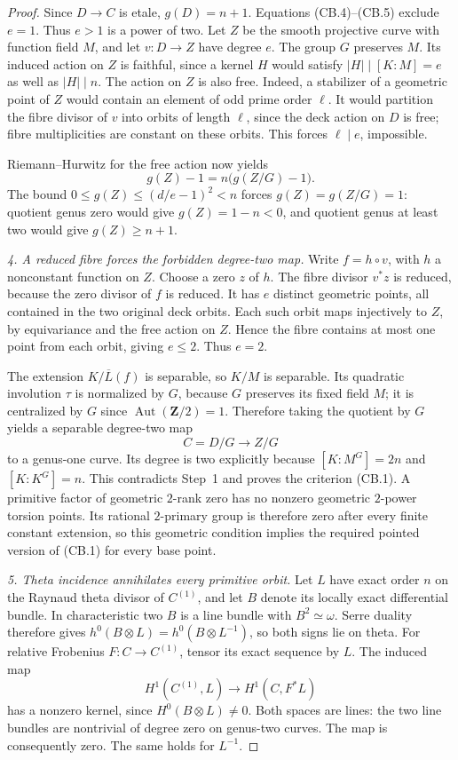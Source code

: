 \begin{proof}
Since $D\to C$ is etale, $g(D)=n+1$. Equations (CB.4)--(CB.5)
exclude $e=1$. Thus $e>1$ is a power of two. Let $Z$ be the smooth
projective curve with function field $M$, and let $v:D\to Z$ have
degree $e$. The group $G$ preserves $M$. Its induced action on $Z$
is faithful, since a kernel $H$ would satisfy
$|H|\mid[K:M]=e$ as well as $|H|\mid n$.
The action on $Z$ is also free. Indeed, a stabilizer of a geometric
point of $Z$ would contain an element of odd prime order $\ell$.
It would partition the fibre divisor of $v$ into orbits of length
$\ell$, since the deck action on $D$ is free; fibre multiplicities
are constant on these orbits. This forces $\ell\mid e$, impossible.

Riemann--Hurwitz for the free action now yields
\[
                    g(Z)-1=n\bigl(g(Z/G)-1\bigr).
\]
The bound $0\le g(Z)\le(d/e-1)^2<n$ forces
$g(Z)=g(Z/G)=1$: quotient genus zero would give $g(Z)=1-n<0$,
and quotient genus at least two would give $g(Z)\ge n+1$.

\emph{4. A reduced fibre forces the forbidden degree-two map.}
Write $f=h\circ v$, with $h$ a nonconstant function on $Z$.
Choose a zero $z$ of $h$. The fibre divisor $v^*z$ is reduced,
because the zero divisor of $f$ is reduced. It has $e$ distinct
geometric points, all contained in the two original deck orbits.
Each such orbit maps injectively to $Z$, by equivariance and the
free action on $Z$. Hence the fibre contains at most one point from
each orbit, giving $e\le2$. Thus $e=2$.

The extension $K/\overline L(f)$ is separable, so $K/M$ is separable.
Its quadratic involution $\tau$ is normalized by $G$, because $G$
preserves its fixed field $M$; it is centralized by $G$ since
$\operatorname{Aut}(\mathbf Z/2)=1$. Therefore taking the quotient
by $G$ yields a separable degree-two map
\[
                  C=D/G\longrightarrow Z/G
\]
to a genus-one curve. Its degree is two explicitly because
$[K:M^G]=2n$ and $[K:K^G]=n$.
This contradicts Step~1 and proves the
criterion (CB.1). A primitive factor of geometric $2$-rank zero
has no nonzero geometric $2$-power torsion points. Its rational
$2$-primary group is therefore zero after every finite constant
extension, so this geometric condition implies the required
pointed version of (CB.1) for every base point.

\emph{5. Theta incidence annihilates every primitive orbit.}
Let $L$ have exact order $n$ on the Raynaud theta divisor of
$C^{(1)}$, and let $B$ denote its locally exact differential bundle.
In characteristic two $B$ is a line bundle with $B^2\simeq\omega$.
Serre duality therefore gives
$h^0(B\otimes L)=h^0(B\otimes L^{-1})$, so both signs lie on theta.
For relative Frobenius $F:C\to C^{(1)}$, tensor its exact sequence
by $L$. The induced map
\[
 H^1(C^{(1)},L)\longrightarrow H^1(C,F^*L)
\]
has a nonzero kernel, since $H^0(B\otimes L)\ne0$.
Both spaces are lines: the two line bundles are nontrivial of
degree zero on genus-two curves. The map is consequently zero.
The same holds for $L^{-1}$.


\end{proof}
